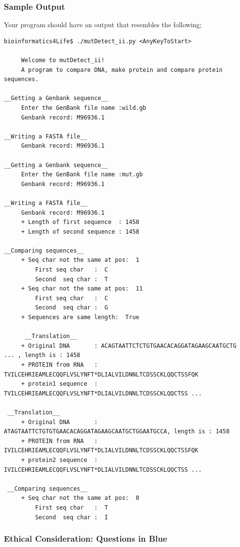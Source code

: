 \subsubsection*{Sample Output}

Your program should have an output that resembles the following;
\begin{center}\small
\begin{verbatim}
bioinformatics4Life$ ./mutDetect_ii.py <AnyKeyToStart>

	 Welcome to mutDetect_ii!
	 A program to compare DNA, make protein and compare protein sequences.

__Getting a Genbank sequence__
	 Enter the GenBank file name :wild.gb
	 Genbank record: M96936.1

__Writing a FASTA file__
	 Genbank record: M96936.1

__Getting a Genbank sequence__
	 Enter the GenBank file name :mut.gb
	 Genbank record: M96936.1

__Writing a FASTA file__
	 Genbank record: M96936.1
	 + Length of first sequence  : 1458
	 + Length of second sequence : 1458

__Comparing sequences__
	 + Seq char not the same at pos:  1
		 First seq char   :  C
		 Second  seq char :  T
	 + Seq char not the same at pos:  11
		 First seq char   :  C
		 Second  seq char :  G
	 + Sequences are same length:  True
	 
	  __Translation__
	 + Original DNA       : ACAGTAATTCTCTGTGAACACAGGATAGAAGCAATGCTG ... , length is : 1458
	 + PROTEIN from RNA   : TVILCEHRIEAMLECQQFLVSLYNFT*DLIALVILDNNLTCDSSCKLQQCTSSFQK
	 + protein1 sequence  : TVILCEHRIEAMLECQQFLVSLYNFT*DLIALVILDNNLTCDSSCKLQQCTSS ...
	 
 __Translation__
	 + Original DNA       : ATAGTAATTCTGTGTGAACACAGGATAGAAGCAATGCTGGAATGCCA, length is : 1458
	 + PROTEIN from RNA   : IVILCEHRIEAMLECQQFLVSLYNFT*DLIALVILDNNLTCDSSCKLQQCTSSFQK
	 + protein2 sequence  : IVILCEHRIEAMLECQQFLVSLYNFT*DLIALVILDNNLTCDSSCKLQQCTSS ... 
	 
 __Comparing sequences__
	 + Seq char not the same at pos:  0
		 First seq char   :  T
		 Second  seq char :  I
\end{verbatim}

\end{center}


\subsubsection*{Ethical Consideration: Questions in Blue}

